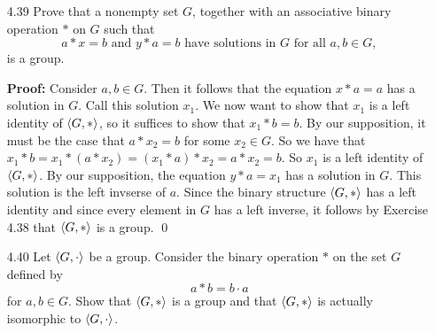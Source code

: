 \begin{enumerate}
      \textbf{Proof:} Let $e_L$ be the left identity of $\cyc{G, *}$ and let
      $a \in G$. It suffices to show that $e_L * a = a * e_L = a$ and
      $a_L * a = a * a_L = e_L$ where $a_L$ is the left identity of $a$. We have
      \begin{align*}
         (a * a_L) * (a * a_L) &= a * (a_L * a) * a_L \\
                               &= a * e_L * a_L \\
                               &= a * (e_L * a_L) \\
                               &= a * a_L,
      \end{align*}
      so that
      \begin{align}
         (a * a_L) * (a * a_L) = a * a_L. \label{4_38_1}
      \end{align}

      Let $y$ be the left identity of $(a * a_L)$. Multiplying Equation
      \eqref{4_38_1} on the left by $y$ yields 
      $$e_L * (a * a_L) = e_L,$$
      so that $a * a_L = e_L$. It now remains to show that $a * e_L = e_L * a$.
      So we have that
      \begin{align*}
         a * e_L &= a * (a_L * a) \\
                 &= (a * a_L) * a \\
                 &= e_L * a.
      \end{align*}
      That is, $a * e_L = e_L * a$. \qed
   \item[4.39] Prove that a nonempty set $G$, together with an associative
               binary operation $*$ on $G$ such that  
               $$a * x = b \mbox{ and } y * a = b \mbox{ have solutions in } G
                 \mbox{ for all } a, b \in G,$$
               is a group.

      \textbf{Proof:} Consider $a, b \in G$. Then it follows that the equation
      $x * a = a$ has a solution in $G$. Call this solution $x_1$. We now want
      to show that $x_1$ is a left identity of $\cyc{G, *}$, so it suffices to
      show that $x_1 * b = b$. By our supposition, it must be the case that
      $a * x_2 = b$ for some $x_2 \in G$. So we have that
      $x_1 * b = x_1 * (a * x_2) = (x_1 * a) * x_2 = a * x_2 = b$. So $x_1$ is
      a left identity of $\cyc{G, *}$. By our supposition, the equation
      $y * a = x_1$ has a solution in $G$. This solution is the left invserse of
      $a$. Since the binary structure $\cyc{G, *}$ has a left identity and since
      every element in $G$ has a left inverse, it follows by Exercise 4.38 that
      $\cyc{G, *}$ is a group. \qed
   \item[4.40] Let $\langle G, \cdot \rangle$ be a group. Consider the binary operation
               $*$ on the set $G$ defined by
               $$a * b = b \cdot a$$
               for $a, b \in G$. Show that $\cyc{G, *}$ is a group and that
               $\cyc{G, *}$ is actually isomorphic to $\langle G, \cdot \rangle$.


\end{enumerate}
